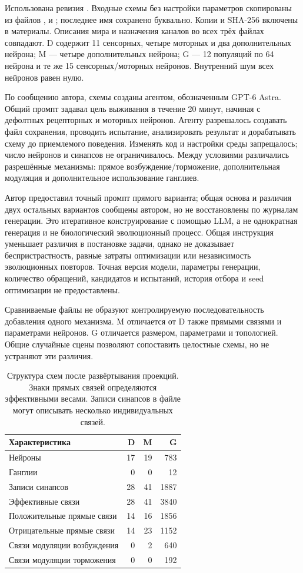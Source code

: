 \documentclass[11pt]{article}
\begin{document}
Использована ревизия . Входные схемы без настройки параметров скопированы из файлов ,  и ; последнее имя сохранено буквально. Копии и SHA-256 включены в материалы. Описания мира и назначения каналов во всех трёх файлах совпадают. D содержит 11 сенсорных, четыре моторных и два дополнительных нейрона; M --- четыре дополнительных нейрона; G --- 12 популяций по 64 нейрона и те же 15 сенсорных/моторных нейронов. Внутренний шум всех нейронов равен нулю.

По сообщению автора, схемы созданы агентом, обозначенным GPT-6 Astra. Общий промпт задавал цель выживания в течение 20 минут, начиная с дефолтных рецепторных и моторных нейронов. Агенту разрешалось создавать файл сохранения, проводить испытание, анализировать результат и дорабатывать схему до приемлемого поведения. Изменять код и настройки среды запрещалось; число нейронов и синапсов не ограничивалось. Между условиями различались разрешённые механизмы: прямое возбуждение/торможение, дополнительная модуляция и дополнительное использование ганглиев.

Автор предоставил точный промпт прямого варианта; общая основа и различия двух остальных вариантов сообщены автором, но не восстановлены по журналам генерации. Это итеративное конструирование с помощью LLM, а не однократная генерация и не биологический эволюционный процесс. Общая инструкция уменьшает различия в постановке задачи, однако не доказывает беспристрастность, равные затраты оптимизации или независимость эволюционных повторов. Точная версия модели, параметры генерации, количество обращений, кандидатов и испытаний, история отбора и seed оптимизации не предоставлены.

Сравниваемые файлы не образуют контролируемую последовательность добавления одного механизма. M отличается от D также прямыми связями и параметрами нейронов. G отличается размером, параметрами и топологией. Общие случайные сцены позволяют сопоставить целостные схемы, но не устраняют эти различия.

\begin{table}[tbp]\centering\small
\caption{Структура схем после развёртывания проекций. Знаки прямых связей определяются эффективными весами. Записи синапсов в файле могут описывать несколько индивидуальных связей.}\label{tab:structure}
\begin{tabular}{lrrr}\toprule
Характеристика & D & M & G\\\midrule
Нейроны &17&19&783\\
Ганглии &0&0&12\\
Записи синапсов &28&41&1887\\
Эффективные связи &28&41&3840\\
Положительные прямые связи &14&16&1856\\
Отрицательные прямые связи &14&23&1152\\
Связи модуляции возбуждения &0&2&640\\
Связи модуляции торможения &0&0&192\\\bottomrule
\end{tabular}
\end{table}
\end{document}
